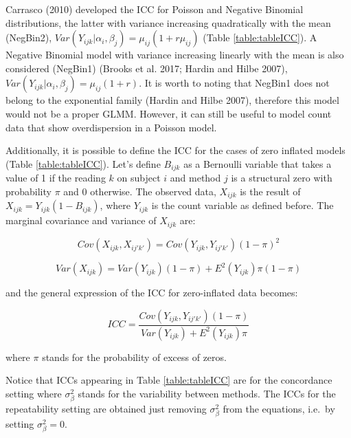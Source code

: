 Carrasco (2010) developed the ICC for Poisson and Negative Binomial distributions, the latter with variance increasing quadratically with the mean (NegBin2), \(Var\left(Y_{ijk}|\alpha_i,\beta_j\right)=\mu_{ij} \left(1+r\mu_{ij}\right)\) (Table \ref{table:tableICC}). A Negative Binomial model with variance increasing linearly with the mean is also considered (NegBin1) (Brooks et al. 2017; Hardin and Hilbe 2007), \(Var\left(Y_{ijk}|\alpha_i,\beta_j\right)=\mu_{ij} \left(1+r\right)\). It is worth to noting that NegBin1 does not belong to the exponential family (Hardin and Hilbe 2007), therefore this model would not be a proper GLMM. However, it can still be useful to model count data that show overdispersion in a Poisson model.

Additionally, it is possible to define the ICC for the cases of zero inflated models (Table \ref{table:tableICC}). Let's define \(B_{ijk}\) as a Bernoulli variable that takes a value of 1 if the reading \(k\) on subject \(i\) and method \(j\) is a structural zero with probability \(\pi\) and 0 otherwise. The observed data, \(X_{ijk}\) is the result of \(X_{ijk}=Y_{ijk}\left(1-B_{ijk}\right)\), where \(Y_{ijk}\) is the count variable as defined before. The marginal covariance and variance of \(X_{ijk}\) are:

\begin{equation}
Cov\left(X_{ijk},X_{ij'k'}\right)=Cov\left(Y_{ijk},Y_{ij'k'}\right)\left(1-\pi\right)^2
\label{eq:cov}
\end{equation}

\begin{equation}
Var\left(X_{ijk}\right)=Var\left(Y_{ijk}\right)\left(1-\pi\right)+E^2\left(Y_{ijk}\right)\pi\left(1-\pi\right)
\label{eq:var}
\end{equation}

and the general expression of the ICC for zero-inflated data becomes:

\begin{equation}
ICC=\frac{Cov\left(Y_{ijk},Y_{ij'k'}\right)\left(1-\pi\right)}{Var\left(Y_{ijk}\right)+E^2\left(Y_{ijk}\right)\pi}
\label{eq:icc3}
\end{equation}

where \(\pi\) stands for the probability of excess of zeros.

Notice that ICCs appearing in Table \ref{table:tableICC} are for the concordance setting where \(\sigma^2_\beta\) stands for the variability between methods. The ICCs for the repeatability setting are obtained just removing \(\sigma^2_\beta\) from the equations, i.e.~by setting \(\sigma^2_\beta=0\).

